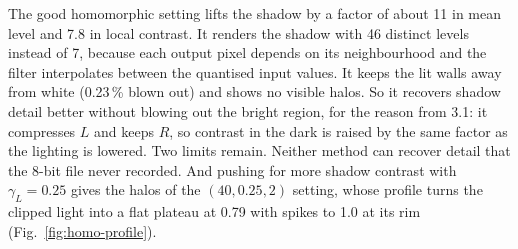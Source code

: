 The good homomorphic setting lifts the shadow by a factor of about 11 in mean
level and 7.8 in local contrast. It renders the shadow with 46 distinct levels
instead of 7, because each output pixel depends on its neighbourhood and the
filter interpolates between the quantised input values. It keeps the lit walls
away from white (0.23\,\% blown out) and shows no visible halos. So it recovers
shadow detail better without blowing out the bright region, for the reason from
3.1: it compresses $L$ and keeps $R$, so contrast in the dark is raised by the
same factor as the lighting is lowered. Two limits remain. Neither method can
recover detail that the 8-bit file never recorded. And pushing for more shadow
contrast with $\gamma_L=0.25$ gives the halos of the $(40,0.25,2)$ setting, whose
profile turns the clipped light into a flat plateau at 0.79 with spikes to 1.0
at its rim (Fig.~\ref{fig:homo-profile}).
